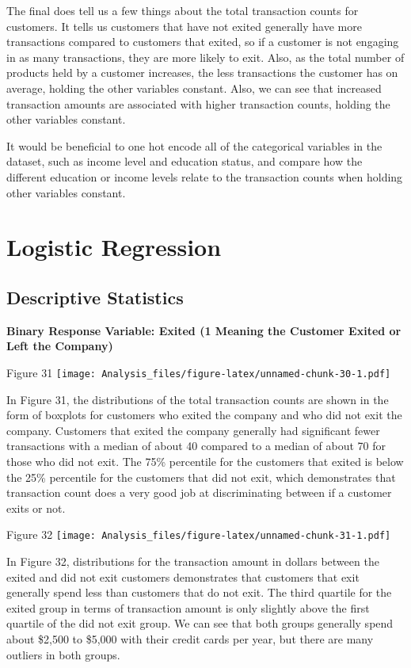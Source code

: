 \documentclass[
]{article}
\begin{document}
The final does tell us a few things about the total transaction counts
for customers. It tells us customers that have not exited generally have
more transactions compared to customers that exited, so if a customer is
not engaging in as many transactions, they are more likely to exit.
Also, as the total number of products held by a customer increases, the
less transactions the customer has on average, holding the other
variables constant. Also, we can see that increased transaction amounts
are associated with higher transaction counts, holding the other
variables constant.

It would be beneficial to one hot encode all of the categorical
variables in the dataset, such as income level and education status, and
compare how the different education or income levels relate to the
transaction counts when holding other variables constant.

\hypertarget{logistic-regression}{%
\section{Logistic Regression}\label{logistic-regression}}

\hypertarget{descriptive-statistics-1}{%
\subsection{Descriptive Statistics}\label{descriptive-statistics-1}}

\textbf{Binary Response Variable: Exited (1 Meaning the Customer Exited
or Left the Company)}

Figure 31
\texttt{[image: Analysis\_files/figure-latex/unnamed-chunk-30-1.pdf]}

In Figure 31, the distributions of the total transaction counts are
shown in the form of boxplots for customers who exited the company and
who did not exit the company. Customers that exited the company
generally had significant fewer transactions with a median of about 40
compared to a median of about 70 for those who did not exit. The 75\%
percentile for the customers that exited is below the 25\% percentile
for the customers that did not exit, which demonstrates that transaction
count does a very good job at discriminating between if a customer exits
or not.

Figure 32
\texttt{[image: Analysis\_files/figure-latex/unnamed-chunk-31-1.pdf]}

In Figure 32, distributions for the transaction amount in dollars
between the exited and did not exit customers demonstrates that
customers that exit generally spend less than customers that do not
exit. The third quartile for the exited group in terms of transaction
amount is only slightly above the first quartile of the did not exit
group. We can see that both groups generally spend about \$2,500 to
\$5,000 with their credit cards per year, but there are many outliers in
both groups.
\end{document}
